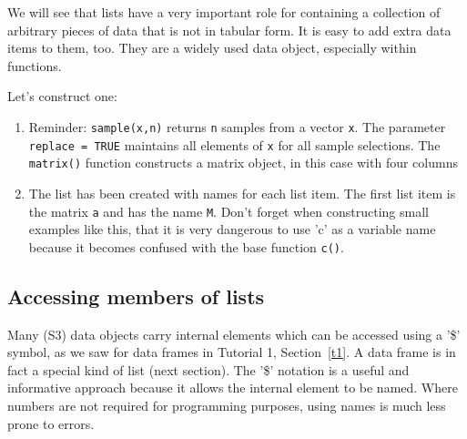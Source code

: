 \documentclass[titlepage]{book}\usepackage{knitr}
\begin{document}
We will see that lists have a very important role for containing a collection of arbitrary pieces of data that is not in tabular form. It is easy to add extra data items to them, too. They are a widely used data object, especially within functions.  

Let's construct one:

\begin{knitrout}
\color{fgcolor}\begin{kframe}
\begin{alltt}
\hlcom{##}
\hlcom{#---------------------------------------------------------------------------------}
  \hlkwb{<-} \hlstd{(}\hlstd{(}\hlopt{:}\hlstd{,} \hlstd{,} \hlstd{=}\hlstd{),} \hlstd{=}\hlstd{)}      
  \hlkwb{<-} \hlstd{(}\hlstd{(}\hlstd{,} \hlstd{,} \hlstd{,} \hlstd{,} \hlstd{),} \hlstd{)}
 \hlkwb{<-} \hlstd{(}\hlstd{,} \hlstd{)}
 \hlkwb{<-} \hlstd{(}                              
\end{alltt}
\end{kframe}
\end{knitrout}

\begin{enumerate}
\item{Reminder: \texttt{sample(x,n)} returns \texttt{n} samples from a vector \texttt{x}.  The parameter \texttt{replace = TRUE} maintains all elements of \texttt{x} for all sample selections. The \texttt{matrix()} function constructs a matrix object, in this case with four columns }
\item{The list has been created with names for each list item. The first list item is the matrix \texttt{a} and has the name \texttt{M}. Don't forget when constructing small examples like this, that it is very dangerous to use 'c' as a variable name because it becomes confused with the base function \texttt{c()}. }
\end{enumerate}

\subsection{Accessing members of lists}\label{L2ListAccess}
Many (S3) data objects carry internal elements which can be accessed using a '\$' symbol, as we saw for data frames in Tutorial 1, Section~\ref{t1}.  A data frame is in fact a special kind of list (next section). The '\$' notation is a useful and informative approach because it allows the internal element to be named. Where numbers are not required for programming purposes, using names is much less prone to errors.
\end{document}
